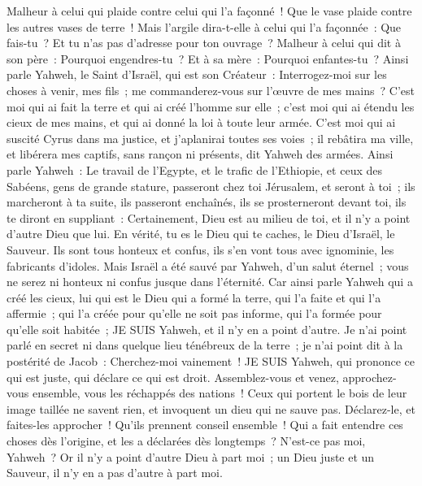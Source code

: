 \begin{multicols}{2}
Malheur à celui qui plaide contre celui qui l'a façonné~! Que le vase plaide contre les autres vases de terre~! Mais l'argile dira-t-elle à celui qui l'a façonnée~: Que fais-tu~? Et tu n'as pas d'adresse pour ton ouvrage~?
Malheur à celui qui dit à son père~: Pourquoi engendres-tu~? Et à sa mère~: Pourquoi enfantes-tu~?
Ainsi parle Yahweh, le Saint d'Israël, qui est son Créateur~: Interrogez-moi sur les choses à venir, mes fils~; me commanderez-vous sur l'œuvre de mes mains~?
C'est moi qui ai fait la terre et qui ai créé l'homme sur elle~; c'est moi qui ai étendu les cieux de mes mains, et qui ai donné la loi à toute leur armée.
C'est moi qui ai suscité Cyrus dans ma justice, et j'aplanirai toutes ses voies~; il rebâtira ma ville, et libérera mes captifs, sans rançon ni présents, dit Yahweh des armées.
Ainsi parle Yahweh~: Le travail de l'Egypte, et le trafic de l'Ethiopie, et ceux des Sabéens, gens de grande stature, passeront chez toi Jérusalem, et seront à toi~; ils marcheront à ta suite, ils passeront enchaînés, ils se prosterneront devant toi, ils te diront en suppliant~: Certainement, Dieu est au milieu de toi, et il n'y a point d'autre Dieu que lui.
En vérité, tu es le Dieu qui te caches, le Dieu d'Israël, le Sauveur.
Ils sont tous honteux et confus, ils s'en vont tous avec ignominie, les fabricants d'idoles.
Mais Israël a été sauvé par Yahweh, d'un salut éternel~; vous ne serez ni honteux ni confus jusque dans l'éternité.
Car ainsi parle Yahweh qui a créé les cieux, lui qui est le Dieu qui a formé la terre, qui l'a faite et qui l'a affermie~; qui l'a créée pour qu'elle ne soit pas informe, qui l'a formée pour qu'elle soit habitée~; JE SUIS Yahweh, et il n'y en a point d'autre.
Je n'ai point parlé en secret ni dans quelque lieu ténébreux de la terre~; je n'ai point dit à la postérité de Jacob~: Cherchez-moi vainement~! JE SUIS Yahweh, qui prononce ce qui est juste, qui déclare ce qui est droit.
Assemblez-vous et venez, approchez-vous ensemble, vous les réchappés des nations~! Ceux qui portent le bois de leur image taillée ne savent rien, et invoquent un dieu qui ne sauve pas.
Déclarez-le, et faites-les approcher~! Qu'ils prennent conseil ensemble~! Qui a fait entendre ces choses dès l'origine, et les a déclarées dès longtemps~? N'est-ce pas moi, Yahweh~? Or il n'y a point d'autre Dieu à part moi~; un Dieu juste et un Sauveur, il n'y en a pas d'autre à part moi.

\end{multicols}
